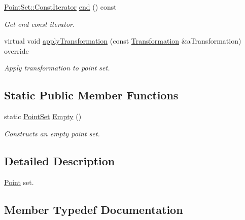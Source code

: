 \begin{DoxyCompactItemize}
\hyperlink{classostk_1_1math_1_1geom_1_1d3_1_1objects_1_1_point_set_aa87eb9a571cb8b420e8c404005a2b723}{Point\+Set\+::\+Const\+Iterator} \hyperlink{classostk_1_1math_1_1geom_1_1d3_1_1objects_1_1_point_set_ad15fd1b2a3609d6e24657118945b579f}{end} () const
\begin{DoxyCompactList}\small\item\em Get end const iterator. \end{DoxyCompactList}\item 
virtual void \hyperlink{classostk_1_1math_1_1geom_1_1d3_1_1objects_1_1_point_set_af03e071aa9d7a364a0c76f563b65a57e}{apply\+Transformation} (const \hyperlink{classostk_1_1math_1_1geom_1_1d3_1_1_transformation}{Transformation} \&a\+Transformation) override
\begin{DoxyCompactList}\small\item\em Apply transformation to point set. \end{DoxyCompactList}\end{DoxyCompactItemize}
\subsection*{Static Public Member Functions}
\begin{DoxyCompactItemize}
\item 
static \hyperlink{classostk_1_1math_1_1geom_1_1d3_1_1objects_1_1_point_set}{Point\+Set} \hyperlink{classostk_1_1math_1_1geom_1_1d3_1_1objects_1_1_point_set_a1b14ed7d73ee7ac5e2796cf44f06ffe9}{Empty} ()
\begin{DoxyCompactList}\small\item\em Constructs an empty point set. \end{DoxyCompactList}\end{DoxyCompactItemize}


\subsection{Detailed Description}
\hyperlink{classostk_1_1math_1_1geom_1_1d3_1_1objects_1_1_point}{Point} set. 

\subsection{Member Typedef Documentation}
\mbox{\label{classostk_1_1math_1_1geom_1_1d3_1_1objects_1_1_point_set_aa87eb9a571cb8b420e8c404005a2b723}} 
